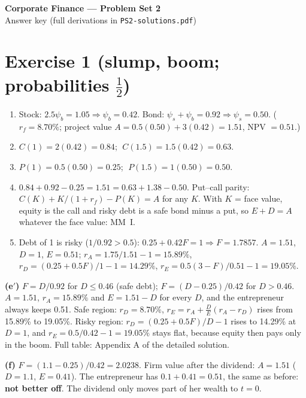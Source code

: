 \documentclass[11pt,a4paper]{article}
\begin{document}
\begin{center}
  {\Large\bfseries Corporate Finance --- Problem Set 2}\\[4pt]
  {\large Answer key (full derivations in \texttt{PS2-solutions.pdf})}
\end{center}

\section*{Exercise 1 \normalsize(slump, boom; probabilities $\tfrac12$)}

\begin{enumerate}[label=(\alph*)]
  \item Stock: $2.5\psi_b = 1.05 \Rightarrow \psi_b = 0.42$. Bond: $\psi_s+\psi_b=0.92 \Rightarrow \psi_s = 0.50$.
        ($r_f = 8.70\%$; project value $A = 0.5(0.50)+3(0.42) = 1.51$, NPV $=0.51$.)
  \item $C(1) = 2(0.42) = 0.84$; $\;C(1.5) = 1.5(0.42) = 0.63$.
  \item $P(1) = 0.5(0.50) = 0.25$; $\;P(1.5) = 1(0.50) = 0.50$.
  \item $0.84 + 0.92 - 0.25 = 1.51 = 0.63 + 1.38 - 0.50$. Put--call parity: $C(K) + K/(1+r_f) - P(K) = A$
        for any $K$. With $K$ = face value, equity is the call and risky debt is a safe bond minus a put,
        so $E + D = A$ whatever the face value: MM~I.
  \item Debt of 1 is risky ($1/0.92 > 0.5$): $0.25 + 0.42F = 1 \Rightarrow F = 1.7857$.
        $A = 1.51$, $D = 1$, $E = 0.51$; $r_A = 1.75/1.51 - 1 = 15.89\%$,
        $r_D = (0.25+0.5F)/1 - 1 = 14.29\%$, $r_E = 0.5(3-F)/0.51 - 1 = 19.05\%$.
\end{enumerate}

\textbf{(e$'$)} $F = D/0.92$ for $D \le 0.46$ (safe debt); $F = (D-0.25)/0.42$ for $D > 0.46$.
$A = 1.51$, $r_A = 15.89\%$ and $E = 1.51 - D$ for every $D$, and the entrepreneur always keeps 0.51.
Safe region: $r_D = 8.70\%$, $r_E = r_A + \frac{D}{E}(r_A - r_D)$ rises from 15.89\% to 19.05\%.
Risky region: $r_D = (0.25 + 0.5F)/D - 1$ rises to 14.29\% at $D=1$, and $r_E = 0.5/0.42 - 1 = 19.05\%$
stays flat, because equity then pays only in the boom. Full table: Appendix A of the detailed solution.

\textbf{(f)} $F = (1.1-0.25)/0.42 = 2.0238$. Firm value after the dividend: $A = 1.51$ ($D = 1.1$,
$E = 0.41$). The entrepreneur has $0.1 + 0.41 = 0.51$, the same as before: \textbf{not better off}.
The dividend only moves part of her wealth to $t=0$.
\end{document}
